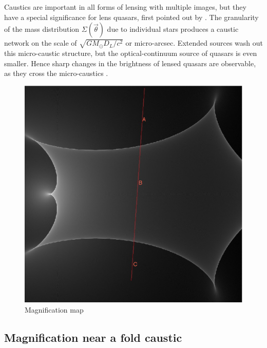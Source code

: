 Caustics are important in all forms of lensing with multiple images,
but they have a special significance for lens quasars, first pointed
out by \cite{1979Natur.282..561C}.  The granularity of the mass
distribution $\Sigma(\vec\theta)$ due to individual stars produces a
caustic network on the scale of $\sqrt{GM_\odot D_L/c^2}$ or
micro-arcsec.  Extended sources wash out this micro-caustic structure,
but the optical-continuum source of quasars is even smaller.  Hence
sharp changes in the brightness of lensed quasars are observable, as
they cross the micro-caustics \citep[e.g.,][]{2012A&A...544A..62S}.

\begin{figure}
\centering
  \includegraphics[width=.9\hsize]{plots/IRIS567_path_2.eps}
\caption{\label{fig:magnification_map} Magnification map}
\end{figure}

\subsection{Magnification near a fold caustic}

